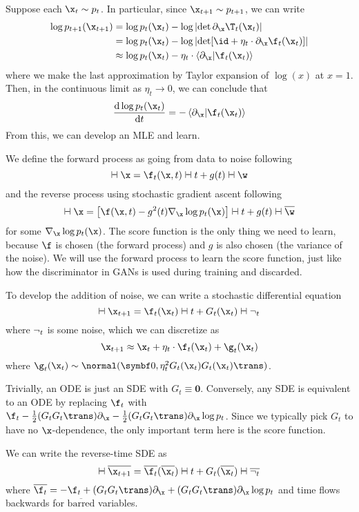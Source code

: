 \documentclass[class=cs480,notes,tikz]{agony}
\begin{document}
Suppose each $\x_t \sim p_t$. In particular, since $\x_{t+1} \sim p_{t+1}$, we can write
\begin{align*}
  \log p_{t+1}(\x_{t+1})
   & = \log p_t(\x_t) - \log\abs{\det\partial_{\x}\T_t(\x_t)}                      \\
   & = \log p_t(\x_t) - \log\abs{\det[\id + \eta_t \cdot \partial_{\x}\f_t(\x_t)]} \\
   & \approx \log p_t(\x_t) - \eta_t \cdot \ip{\partial_{\x}}{\f_t(\x_t)}
\end{align*}
where we make the last approximation by Taylor expansion of $\log(x)$ at $x=1$.
Then, in the continuous limit as $\eta_t \to 0$,
we can conclude that
\[ \dv{\log p_t(\x_t)}{t} = -\ip{\partial_{\x}}{\f_t(\x_t)} \]
From this, we can develop an MLE and learn.

We define the forward process as going from data to noise following
\[ \dd{\x} = \f_t(\x,t)\dd{t} + g(t) \dd{\w} \]
and the reverse process using stochastic gradient ascent following
\begin{equation}\label{eq:revsde}
  \dd{\x} = \qty[\f(\x,t) - g^2(t)\nabla_{\x}\log p_t(\x)] \dd{t} + g(t) \dd{\overline{\w}}
\end{equation}
for some  $\nabla_{\x}\log p_t(\x)$.
The score function is the only thing we need to learn,
because $\f$ is chosen (the forward process) and $g$ is also chosen (the variance of the noise).
We will use the forward process to learn the score function,
just like how the discriminator in GANs is used during training and discarded.

To develop the addition of noise, we can write a stochastic differential equation
\[ \dd{\x_{t+1}} = \f_t(\x_t) \dd{t} + G_t(\x_t) \dd{\n_t} \]
where $\lnot_t$ is some noise, which we can discretize as
\begin{equation}\label{eq:fwdisc}
  \x_{t+1} \approx \x_t + \eta_t \cdot \f_t(\x_t) + \g_t(\x_t)
\end{equation}
where $\g_t(\x_t) \sim \normal(\symbf0,\eta_t^2G_t(\x_t)G_t(\x_t)\trans)$.

Trivially, an ODE is just an SDE with $G_t \equiv \symbf0$.
Conversely, any SDE is equivalent to an ODE by replacing $\f_t$
with $\f_t - \frac12(G_tG_t\trans)\partial_{\x} - \frac12(G_tG_t\trans)\partial_{\x}\log p_t$.
Since we typically pick $G_t$ to have no $\x$-dependence,
the only important term here is the score function.

We can write the reverse-time SDE as
\[ \dd{\overline{\x_{t+1}}} = \overline{\f_t}(\overline{\x_t}) \dd{t} + G_t(\overline{\x_t}) \dd{\overline{\n_t}} \]
where $\overline{\f_t} = -\f_t + (G_tG_t\trans)\partial_{\x} + (G_tG_t\trans)\partial_{\x}\log p_t$
and time flows backwards for $\overline{\text{barred}}$ variables.
\end{document}
